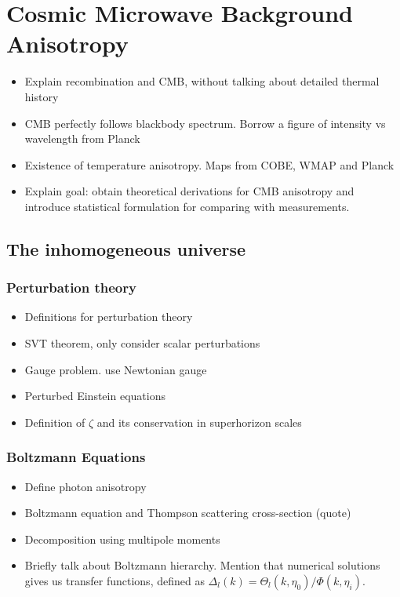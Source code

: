 
\chapter{Cosmic Microwave Background Anisotropy}

\ifpdf
    \graphicspath{{Chapter2/Figs/Raster/}{Chapter2/Figs/PDF/}{Chapter2/Figs/}}
\else
    \graphicspath{{Chapter2/Figs/Vector/}{Chapter2/Figs/}}
\fi


\begin{itemize}
	\item Explain recombination and CMB, without talking about detailed thermal history 
	\item CMB perfectly follows blackbody spectrum. Borrow a figure of intensity vs wavelength from Planck
	\item Existence of temperature anisotropy. Maps from COBE, WMAP and Planck
	\item Explain goal: obtain theoretical derivations for CMB anisotropy and introduce statistical formulation for comparing with measurements.	
\end{itemize}

\section{The inhomogeneous universe}

\subsection{Perturbation theory}
\begin{itemize}
	\item Definitions for perturbation theory
	\item SVT theorem, only consider scalar perturbations
	\item Gauge problem. use Newtonian gauge
	\item Perturbed Einstein equations
	\item Definition of $\zeta$ and its conservation in superhorizon scales
\end{itemize}

\subsection{Boltzmann Equations}
\begin{itemize}
	\item Define photon anisotropy
	\item Boltzmann equation and Thompson scattering cross-section (quote)
	\item Decomposition using multipole moments
	\item Briefly talk about Boltzmann hierarchy. Mention that numerical solutions gives us transfer functions, defined as $\Delta_l (k) = \Theta_l(k,\eta_0) / \Phi(k,\eta_i)$.
\end{itemize}

